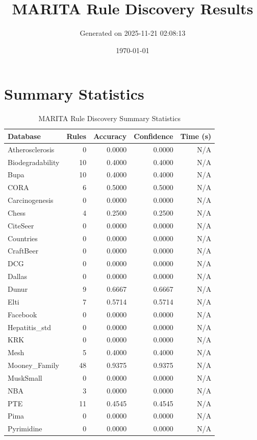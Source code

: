 \documentclass[11pt,a4paper]{article}
\title{MARITA Rule Discovery Results}
\author{Generated on 2025-11-21 02:08:13}
\date{\today}
\begin{document}
\maketitle

\section{Summary Statistics}
\begin{table}[h!]
\centering
\caption{MARITA Rule Discovery Summary Statistics}
\label{tab:marita_summary}
\begin{tabular}{|l|r|r|r|r|}
\hline
\textbf{Database} & \textbf{Rules} & \textbf{Accuracy} & \textbf{Confidence} & \textbf{Time (s)} \\
\hline
Atherosclerosis & 0 & 0.0000 & 0.0000 & N/A \\
Biodegradability & 10 & 0.4000 & 0.4000 & N/A \\
Bupa & 10 & 0.4000 & 0.4000 & N/A \\
CORA & 6 & 0.5000 & 0.5000 & N/A \\
Carcinogenesis & 0 & 0.0000 & 0.0000 & N/A \\
Chess & 4 & 0.2500 & 0.2500 & N/A \\
CiteSeer & 0 & 0.0000 & 0.0000 & N/A \\
Countries & 0 & 0.0000 & 0.0000 & N/A \\
CraftBeer & 0 & 0.0000 & 0.0000 & N/A \\
DCG & 0 & 0.0000 & 0.0000 & N/A \\
Dallas & 0 & 0.0000 & 0.0000 & N/A \\
Dunur & 9 & 0.6667 & 0.6667 & N/A \\
Elti & 7 & 0.5714 & 0.5714 & N/A \\
Facebook & 0 & 0.0000 & 0.0000 & N/A \\
Hepatitis_std & 0 & 0.0000 & 0.0000 & N/A \\
KRK & 0 & 0.0000 & 0.0000 & N/A \\
Mesh & 5 & 0.4000 & 0.4000 & N/A \\
Mooney_Family & 48 & 0.9375 & 0.9375 & N/A \\
MuskSmall & 0 & 0.0000 & 0.0000 & N/A \\
NBA & 3 & 0.0000 & 0.0000 & N/A \\
PTE & 11 & 0.4545 & 0.4545 & N/A \\
Pima & 0 & 0.0000 & 0.0000 & N/A \\
Pyrimidine & 0 & 0.0000 & 0.0000 & N/A \\

\end{tabular}
\end{table}
\end{document}
